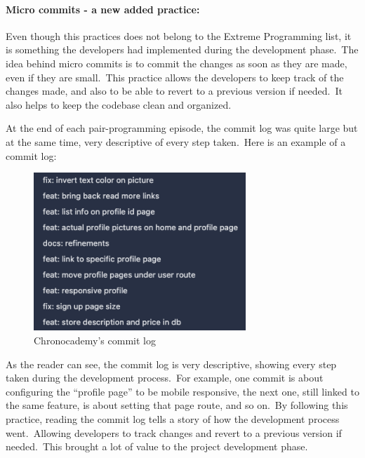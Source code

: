 \paragraph{Micro commits - a new added practice:} Even though this practices does not belong to the Extreme Programming list, it is something the developers had implemented during the development phase.\ The idea behind micro commits is to commit the changes as soon as they are made, even if they are small.\ This practice allows the developers to keep track of the changes made, and also to be able to revert to a previous version if needed.\ It also helps to keep the codebase clean and organized.

At the end of each pair-programming episode, the commit log was quite large but at the same time, very descriptive of every step taken.\ Here is an example of a commit log:
\begin{figure}[h]
    \centering
    \includegraphics[width=8cm]{images/commit-log}
    \caption{Chronocademy's commit log}
    \label{fig:figure23}
\end{figure}

As the reader can see, the commit log is very descriptive, showing every step taken during the development process.\ For example, one commit is about configuring the ``profile page'' to be mobile responsive, the next one, still linked to the same feature, is about setting that page route, and so on.\ By following this practice, reading the commit log tells a story of how the development process went.\ Allowing developers to track changes and revert to a previous version if needed.\ This brought a lot of value to the project development phase.